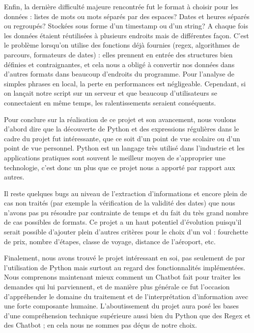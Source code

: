\documentclass[]{article}
\begin{document}
{Enfin, la dernière difficulté majeure rencontrée fut le format à choisir pour les données : listes de mots ou mots séparés par des espaces? Dates et heures séparés ou regroupés? Stockées sous forme d’un timestamp ou d’un string? A chaque fois les données étaient réutilisées à plusieurs endroits mais de différentes façon. C’est le problème lorsqu’on utilise des fonctions déjà fournies (regex, algorithmes de parcours, formateurs de dates) : elles prennent en entrée des structures bien définies et contraignantes, et cela nous a obligé à convertir nos données dans d’autres formats dans beaucoup d’endroits du programme. Pour l’analyse de simples phrases en local, la perte en performances est négligeable. Cependant, si on lançait notre script sur un serveur et que beaucoup d’utilisateurs se connectaient en même temps, les ralentissements seraient conséquents.
}

\newpage
\Huge{\textbf{\color{title}{Avancement et Conclusion}}}

\bigskip
\bigskip

\large{


Pour conclure sur la réalisation de ce projet et son avancement, nous voulons d’abord dire que la découverte de Python et des expressions régulières dans le cadre du projet fut intéressante, que ce soit d’un point de vue scolaire ou d’un point de vue personnel. Python est un langage très utilisé dans l’industrie et les applications pratiques sont souvent le meilleur moyen de s’approprier une technologie, c’est donc un plus que ce projet nous a apporté par rapport aux autres.

Il reste quelques bugs au niveau de l’extraction d’informations et encore plein de cas non traités (par exemple la vérification de la validité des dates) que nous n’avons pas pu résoudre par contrainte de temps et du fait du très grand nombre de cas possibles de formats.
Ce projet a un haut potentiel d’évolution puisqu’il serait possible d’ajouter plein d’autres critères pour le choix d’un vol : fourchette de prix, nombre d’étapes, classe de voyage, distance de l’aéroport, etc.


Finalement, nous avons trouvé le projet intéressant en soi, pas seulement de par l’utilisation de Python mais surtout au regard des fonctionnalités implémentées. Nous comprenons maintenant mieux comment un Chatbot fait pour traiter les demandes qui lui parviennent, et de manière plus générale ce fut l’occasion d’appréhender le domaine du traitement et de l’interprétation d’information avec une forte composante humaine. L’aboutissement du projet aura posé les bases d’une compréhension technique supérieure aussi bien du Python que des Regex et des Chatbot ; en cela nous ne sommes pas déçus de notre choix.

}
\end{document}
